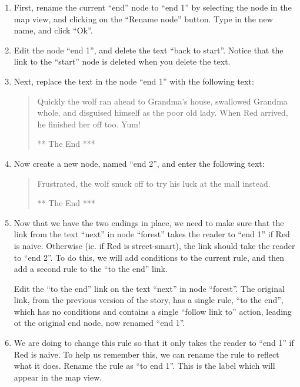 \documentclass{article}
\begin{document}
\begin{enumerate}
  \item First, rename the current ``end'' node to ``end 1'' by selecting the
  node in the map view, and clicking on the ``Rename node'' button. Type in the
  new name, and click ``Ok''.
  \item Edit the node ``end 1'', and delete the text ``back to start''. Notice
  that the link to the ``start'' node is deleted when you delete the text.
  \item Next, replace the text in the node ``end 1'' with the following text:
  \begin{quotation}
  \noindent Quickly the wolf ran ahead to Grandma's house, swallowed Grandma
  whole, and disguised himself as the poor old lady. When Red arrived, he finished her
  off too. Yum!
  
  \bigskip
  
  \noindent *** The End ***
  \end{quotation}
  \item Now create a new node, named ``end 2'', and enter the following text:
  \begin{quotation}
  \noindent Frustrated, the wolf snuck off to try his luck at the mall instead.
  
  \bigskip
  
  \noindent *** The End ***
  \end{quotation}

\item Now that we have the two endings in place, we need to make sure that the
link from the text ``next'' in node ``forest'' takes the reader to ``end 1'' if Red
is naive. Otherwise (ie. if Red is street-smart), the link should take the
reader to ``end 2''. To do this, we will add conditions to the current rule,
and then add a second rule to the ``to the end'' link.

Edit the ``to the end'' link on the text ``next'' in node ``forest''.
The original link, from the previous version of the story, has a single rule,
``to the end'', which has no conditions and contains a single ``follow link
to'' action, leading ot the original end node, now renamed ``end 1''.

\item We are doing to change this rule so that it only takes the reader to
``end 1'' if Red is naive. To help us remember this, we can rename the rule to
reflect what it does. Rename the rule as ``to end 1''. This is the label which
will appear in the map view.


\end{enumerate}
\end{document}
